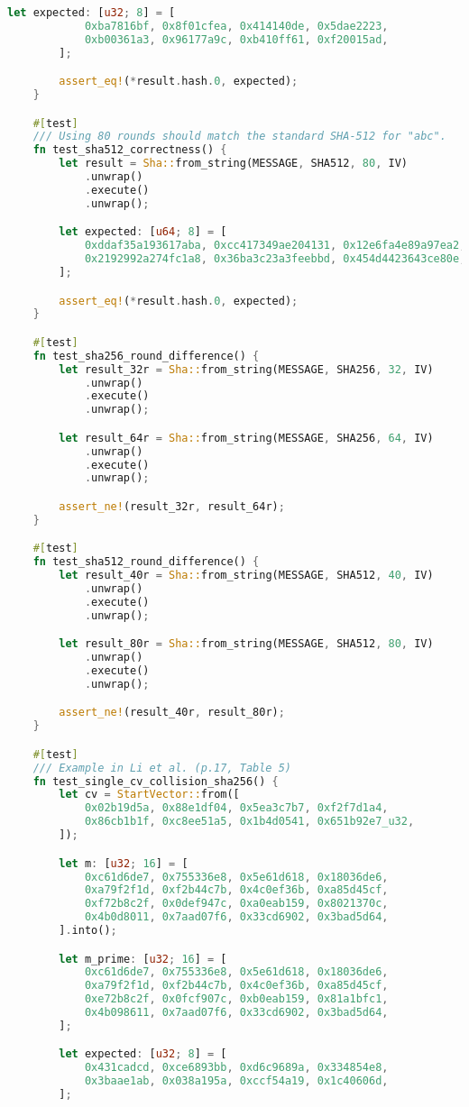 \begin{lstlisting}[language=rust, caption={sha/sha.rs}]
		let expected: [u32; 8] = [
			0xba7816bf, 0x8f01cfea, 0x414140de, 0x5dae2223,
			0xb00361a3, 0x96177a9c, 0xb410ff61, 0xf20015ad,
		];

		assert_eq!(*result.hash.0, expected);
	}

	#[test]
	/// Using 80 rounds should match the standard SHA-512 for "abc".
	fn test_sha512_correctness() {
		let result = Sha::from_string(MESSAGE, SHA512, 80, IV)
			.unwrap()
			.execute()
			.unwrap();

		let expected: [u64; 8] = [
			0xddaf35a193617aba, 0xcc417349ae204131, 0x12e6fa4e89a97ea2, 0x0a9eeee64b55d39a,
			0x2192992a274fc1a8, 0x36ba3c23a3feebbd, 0x454d4423643ce80e, 0x2a9ac94fa54ca49f,
		];

		assert_eq!(*result.hash.0, expected);
	}

	#[test]
	fn test_sha256_round_difference() {
		let result_32r = Sha::from_string(MESSAGE, SHA256, 32, IV)
			.unwrap()
			.execute()
			.unwrap();

		let result_64r = Sha::from_string(MESSAGE, SHA256, 64, IV)
			.unwrap()
			.execute()
			.unwrap();

		assert_ne!(result_32r, result_64r);
	}

	#[test]
	fn test_sha512_round_difference() {
		let result_40r = Sha::from_string(MESSAGE, SHA512, 40, IV)
			.unwrap()
			.execute()
			.unwrap();

		let result_80r = Sha::from_string(MESSAGE, SHA512, 80, IV)
			.unwrap()
			.execute()
			.unwrap();

		assert_ne!(result_40r, result_80r);
	}

	#[test]
	/// Example in Li et al. (p.17, Table 5)
	fn test_single_cv_collision_sha256() {
		let cv = StartVector::from([
			0x02b19d5a, 0x88e1df04, 0x5ea3c7b7, 0xf2f7d1a4,
			0x86cb1b1f, 0xc8ee51a5, 0x1b4d0541, 0x651b92e7_u32,
		]);

		let m: [u32; 16] = [
			0xc61d6de7, 0x755336e8, 0x5e61d618, 0x18036de6,
			0xa79f2f1d, 0xf2b44c7b, 0x4c0ef36b, 0xa85d45cf,
			0xf72b8c2f, 0x0def947c, 0xa0eab159, 0x8021370c,
			0x4b0d8011, 0x7aad07f6, 0x33cd6902, 0x3bad5d64,
		].into();

		let m_prime: [u32; 16] = [
			0xc61d6de7, 0x755336e8, 0x5e61d618, 0x18036de6,
			0xa79f2f1d, 0xf2b44c7b, 0x4c0ef36b, 0xa85d45cf,
			0xe72b8c2f, 0x0fcf907c, 0xb0eab159, 0x81a1bfc1,
			0x4b098611, 0x7aad07f6, 0x33cd6902, 0x3bad5d64,
		];

		let expected: [u32; 8] = [
			0x431cadcd, 0xce6893bb, 0xd6c9689a, 0x334854e8,
			0x3baae1ab, 0x038a195a, 0xccf54a19, 0x1c40606d,
		];


\end{lstlisting}
